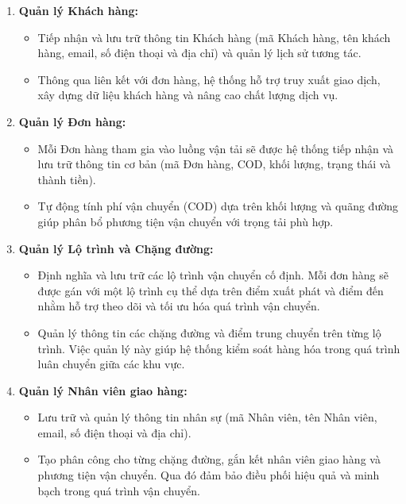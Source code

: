 \documentclass[11pt]{report}
\begin{document}
\begin{enumerate}
    \item \textbf{Quản lý Khách hàng:}
    \begin{itemize}
        \item Tiếp nhận và lưu trữ thông tin Khách hàng (mã Khách hàng, tên khách hàng, email, số điện thoại và địa chỉ) và quản lý lịch sử tương tác.
        
        \item Thông qua liên kết với đơn hàng, hệ thống hỗ trợ truy xuất giao dịch, xây dựng dữ liệu khách hàng và nâng cao chất lượng dịch vụ.
    \end{itemize}
    
    \item \textbf{Quản lý Đơn hàng:}
    \begin{itemize}
        \item Mỗi Đơn hàng tham gia vào luồng vận tải sẽ được hệ thống tiếp nhận và lưu trữ thông tin cơ bản (mã Đơn hàng, COD, khối lượng, trạng thái và thành tiền).
        
        \item Tự động tính phí vận chuyển (COD) dựa trên khối lượng và quãng đường giúp phân bổ phương tiện vận chuyển với trọng tải phù hợp.
    \end{itemize}

    \item \textbf{Quản lý Lộ trình và Chặng đường:}
    \begin{itemize}
        \item Định nghĩa và lưu trữ các lộ trình vận chuyển cố định. Mỗi đơn hàng sẽ được gán với một lộ trình cụ thể dựa trên điểm xuất phát và điểm đến nhằm hỗ trợ theo dõi và tối ưu hóa quá trình vận chuyển.
        
        \item Quản lý thông tin các chặng đường và điểm trung chuyển trên từng lộ trình. Việc quản lý này giúp hệ thống kiểm soát hàng hóa trong quá trình luân chuyển giữa các khu vực.
    \end{itemize}
    
    \item \textbf{Quản lý Nhân viên giao hàng:}
    \begin{itemize}
        \item Lưu trữ và quản lý thông tin nhân sự (mã Nhân viên, tên Nhân viên, email, số điện thoại và địa chỉ).
        
        \item Tạo phân công cho từng chặng đường, gắn kết nhân viên giao hàng và phương tiện vận chuyển. Qua đó đảm bảo điều phối hiệu quả và minh bạch trong quá trình vận chuyển.
    \end{itemize}
    

\end{enumerate}
\end{document}
